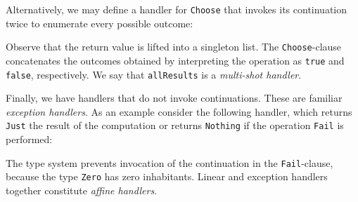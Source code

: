 \documentclass[preprint,numbers]{sigplanconf}
\newcommand{\msgbox}[2]{{%
  \par\noindent\small\color{red}%
  \framebox{\parbox{\dimexpr\linewidth-2\fboxsep-2\fboxrule}{\textbf{#1:} #2}}%
}}
\newcommand{\kc}[1]{\msgbox{KC}{#1}}
\begin{document}
Alternatively, we may define a handler for \lstinline$Choose$ that
invokes its continuation twice to enumerate every possible outcome:
%

%
Observe that the return value is lifted into a singleton list. The
\lstinline$Choose$-clause concatenates the outcomes obtained by
interpreting the operation as \lstinline$true$ and \lstinline$false$,
respectively. We say that \lstinline$allResults$ is a \emph{multi-shot
  handler}.

Finally, we have handlers that do not invoke continuations. These are
familiar \emph{exception handlers}. As an example consider the
following handler, which returns \lstinline$Just$ the result of the
computation or returns \lstinline$Nothing$ if the operation
\lstinline$Fail$ is performed:
%

%
The type system prevents invocation of the continuation in the
\lstinline$Fail$-clause, because the type \lstinline$Zero$ has zero
inhabitants. Linear and exception handlers together constitute
\emph{affine handlers}.

\end{document}
